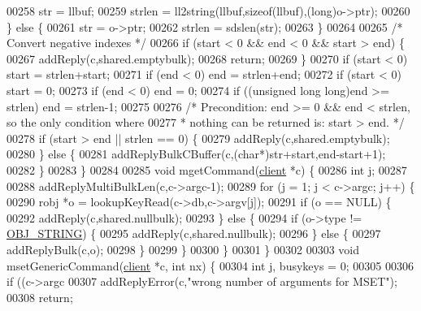 \begin{DoxyCode}
{00258         str = llbuf;
00259         strlen = ll2string(llbuf,\textcolor{keyword}{sizeof}(llbuf),(\textcolor{keywordtype}{long})o->ptr);
00260     \} \textcolor{keywordflow}{else} \{
00261         str = o->ptr;
00262         strlen = sdslen(str);
00263     \}
00264 
00265     \textcolor{comment}{/* Convert negative indexes */}
00266     \textcolor{keywordflow}{if} (start < 0 && end < 0 && start > end) \{
00267         addReply(c,shared.emptybulk);
00268         \textcolor{keywordflow}{return};
00269     \}
00270     \textcolor{keywordflow}{if} (start < 0) start = strlen+start;
00271     \textcolor{keywordflow}{if} (end < 0) end = strlen+end;
00272     \textcolor{keywordflow}{if} (start < 0) start = 0;
00273     \textcolor{keywordflow}{if} (end < 0) end = 0;
00274     \textcolor{keywordflow}{if} ((\textcolor{keywordtype}{unsigned} \textcolor{keywordtype}{long} \textcolor{keywordtype}{long})end >= strlen) end = strlen-1;
00275 
00276     \textcolor{comment}{/* Precondition: end >= 0 && end < strlen, so the only condition where}
00277 \textcolor{comment}{     * nothing can be returned is: start > end. */}
00278     \textcolor{keywordflow}{if} (start > end || strlen == 0) \{
00279         addReply(c,shared.emptybulk);
00280     \} \textcolor{keywordflow}{else} \{
00281         addReplyBulkCBuffer(c,(\textcolor{keywordtype}{char}*)str+start,end-start+1);
00282     \}
00283 \}
00284 
00285 \textcolor{keywordtype}{void} mgetCommand(\hyperlink{structclient}{client} *c) \{
00286     \textcolor{keywordtype}{int} j;
00287 
00288     addReplyMultiBulkLen(c,c->argc-1);
00289     \textcolor{keywordflow}{for} (j = 1; j < c->argc; j++) \{
00290         robj *o = lookupKeyRead(c->db,c->argv[j]);
00291         \textcolor{keywordflow}{if} (o == NULL) \{
00292             addReply(c,shared.nullbulk);
00293         \} \textcolor{keywordflow}{else} \{
00294             \textcolor{keywordflow}{if} (o->type != \hyperlink{server_8h_a65236ea160f69cdef33ec942092af88f}{OBJ\_STRING}) \{
00295                 addReply(c,shared.nullbulk);
00296             \} \textcolor{keywordflow}{else} \{
00297                 addReplyBulk(c,o);
00298             \}
00299         \}
00300     \}
00301 \}
00302 
00303 \textcolor{keywordtype}{void} msetGenericCommand(\hyperlink{structclient}{client} *c, \textcolor{keywordtype}{int} nx) \{
00304     \textcolor{keywordtype}{int} j, busykeys = 0;
00305 
00306     \textcolor{keywordflow}{if} ((c->argc %
00307         addReplyError(c,\textcolor{stringliteral}{"wrong number of arguments for MSET"});
00308         \textcolor{keywordflow}{return};
}
\end{DoxyCode}
